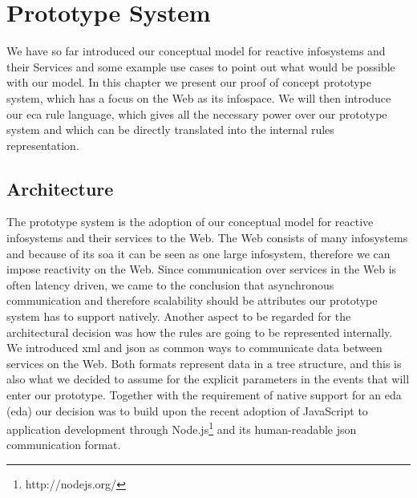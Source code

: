 

\chapter{Prototype System}
We have so far introduced our conceptual model for reactive \textrm{\glspl{infosystem}} and their Services and some example use cases to point out what would be possible with our model.
In this chapter we present our proof of concept prototype system, which has a focus on the Web as its \textrm{\gls{infospace}}.
We will then introduce our \textrm{\acrshort{eca}} rule language, which gives all the necessary power over our prototype system and which can be directly translated into the internal rules representation.



\section{Architecture}
The prototype system is the adoption of our conceptual model for reactive \textrm{\glspl{infosystem}} and their services to the Web.
The Web consists of many \textrm{\glspl{infosystem}} and because of its \textrm{\acrlong{soa}} it can be seen as one large \textrm{\gls{infosystem}}, therefore we can impose reactivity on the Web.
Since communication over services in the Web is often latency driven, we came to the conclusion that asynchronous communication and therefore scalability should be attributes our prototype system has to support natively.
Another aspect to be regarded for the architectural decision was how the rules are going to be represented internally.
We introduced \textrm{\acrshort{xml}} and \textrm{\acrshort{json}} as common ways to communicate data between services on the Web.
Both formats represent data in a tree structure, and this is also what we decided to assume for the explicit parameters in the events that will enter our prototype.
Together with the requirement of native support for an \textrm{\acrlong{eda} (\acrshort{eda})} our decision was to build upon the recent adoption of \textrm{JavaScript} to application development through \textrm{Node.js}\footnote{http://nodejs.org/} and its human-readable \textrm{\acrshort{json}} communication format.

